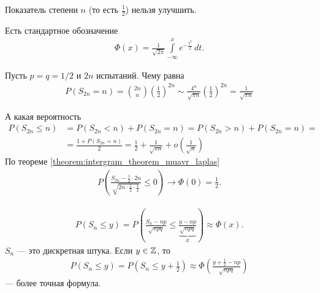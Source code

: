 \documentclass[../main.tex]{subfiles}
\begin{document}
\begin{remrk*}
 Показатель степени $n$ (то есть $\frac{1}{2}$) нельзя улучшить.
\end{remrk*}

\begin{notatn*}
 Есть стандартное обозначение
 \begin{align*}
  \Phi(x) = \frac{1}{\sqrt{2\pi}} \int\limits_{-\infty}^{x} e^{-\frac{t^{2}}{2}}\,dt
 .\end{align*} 
\end{notatn*}

\begin{exmpl*}
 Пусть $p = q = 1 / 2$ и  $2n$ испытаний. Чему равна
 \begin{align*}
  P(S_{2n} = n) = \binom {2n} n \left( \frac{1}{2} \right)^{2n} \sim \frac{4^{n}}{\sqrt{\pi n}} \left( \frac{1}{2} \right)^{2n} = \frac{1}{\sqrt{\pi n}}
 \end{align*} 

 А какая вероятность
 \begin{align*}
  P(S_{2n} \leqslant n) &= P(S_{2n} < n) + P(S_{2n} = n) = P(S_{2n} > n) + P(S_{2n} = n) = \\
  &= \frac{1 + P(S_{2n} = n)}{2} = \frac{1}{2} + \frac{1}{\sqrt{\pi n}} + o \left( \frac{1}{\sqrt{n}} \right)
 \end{align*} По теореме \ref{theorem:intergram_theorem_muavr_laplas}
 \begin{align*}
  P\left(\frac{S_{2n} - \frac{1}{2} \cdot 2n}{\sqrt{2n \cdot \frac{1}{2} \cdot \frac{1}{2}}} \leqslant 0\right) \to \Phi(0) = \frac{1}{2}.
 \end{align*} 
\end{exmpl*}

\begin{remrk*}
 \begin{align*}
  P(S_n \leqslant y) = P\left(\frac{S_n - np}{\sqrt{npq}} \leqslant \underbrace{\frac{y - np}{\sqrt{npq}}}_{x}\right) \approx \Phi(x)
 .\end{align*} $S_n$ --- это дискретная штука. Если  $y \in \mathbb{Z}$, то
 \begin{align*}
  P(S_n \leqslant y) = P\left(S_n \leqslant y + \frac{1}{2}\right) \approx \Phi \left( \frac{y + \frac{1}{2} - np}{\sqrt{npq}} \right)
 \end{align*} --- более точная формула.
\end{remrk*}
\end{document}
